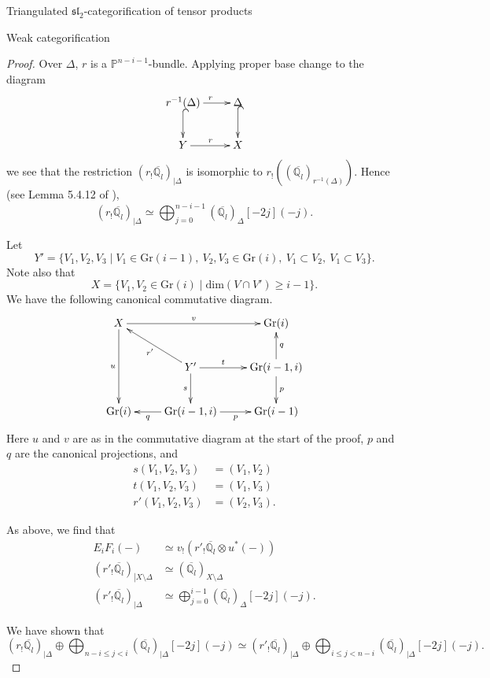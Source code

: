 \documentclass[12pt]{amsart}
\theoremstyle{definition}
\theoremstyle{remark}
\theoremstyle{remark}
\begin{document}
\begin{section}{Triangulated $\mathfrak{sl}_{2}$-categorification of tensor products}
\begin{subsection}{Weak categorification}
\begin{proof}
Over $\Delta$, $r$ is a $\mathbb{P}^{n-i-1}$-bundle. Applying proper base change to the diagram \[ \xymatrix{ r^{-1}(\Delta) \ar@{^{(}->}[d] \ar[r]^{r} & \Delta \ar@{^{(}->}[d] \\ Y \ar[r]^{r} & X } \] we see that the restriction $(r_{!} \overline{\mathbb{Q}_{l}})_{\left| \Delta \right.}$ is isomorphic to $r_{!} ((\overline{\mathbb{Q}_{l}})_{r^{-1}(\Delta)})$. Hence (see Lemma 5.4.12 of \cite{BeilinsonBernsteinDeligneFaisceauxPervers}),  \[ (r_{!} \overline{\mathbb{Q}_{l}})_{\left| \Delta \right.} \simeq  \bigoplus_{j=0}^{n-i-1} (\overline{\mathbb{Q}_{l}})_{\Delta}[-2j](-j). \] 

Let \[ Y' = \{ V_{1}, V_{2}, V_{3} \mid V_{1} \in \text{Gr}(i-1), \ V_{2}, V_{3} \in \text{Gr}(i), \  V_{1} \subset V_{2}, \ V_{1} \subset V_{3} \}. \] Note also that \[ X = \{ V_{1}, V_{2} \in \text{Gr}(i) \mid \text{dim} (V \cap V') \geq i-1 \}. \] We have the following canonical commutative diagram. \[ \xymatrix{ X \ar[rr]^-{v} \ar[dd]_-{u} &  & \text{Gr}(i) \\ & Y' \ar[ul]^-{r'} \ar[r]^-{t} \ar[d]_-{s} & \text{Gr}(i-1,i) \ar[u]_-{q} \ar[d]^-{p} \\ \text{Gr}(i) & \text{Gr}(i-1,i) \ar[l]^-{q} \ar[r]_-{p} & \text{Gr}(i-1) } \] Here $u$ and $v$ are as in the commutative diagram at the start of the proof, $p$ and $q$ are the canonical projections, and \begin{align*} s(V_{1},V_{2},V_{3}) &= (V_{1},V_{2}) \\ t(V_{1},V_{2},V_{3}) &= (V_{1},V_{3}) \\ r'(V_{1},V_{2},V_{3}) &= (V_{2},V_{3}). \end{align*} 

As above, we find that \begin{align*} E_{i}F_{i}(-) &\simeq  v_{!}(r'_{!} \overline{\mathbb{Q}_{l}} \otimes u^{*}(-)) \\ (r'_{!} \overline{\mathbb{Q}_{l}})_{\left| X \setminus \Delta \right.} &\simeq (\overline{\mathbb{Q}_{l}})_{X \setminus \Delta} \\ (r'_{!} \overline{\mathbb{Q}_{l}})_{\left| \Delta \right.} &\simeq \bigoplus_{j=0}^{i-1} (\overline{\mathbb{Q}_{l}})_{\Delta}[-2j](-j). \end{align*} 

We have shown that \[ (r_{!} \overline{\mathbb{Q}_{l}})_{\left| \Delta \right.}  \oplus \bigoplus_{n-i \leq j < i}  (\overline{\mathbb{Q}_{l}})_{\left| \Delta \right.}[-2j](-j) \simeq (r'_{!} \overline{\mathbb{Q}_{l}})_{\left| \Delta \right.} \oplus \bigoplus_{i \leq j < n-i}  (\overline{\mathbb{Q}_{l}})_{\left| \Delta \right.}[-2j](-j). \]


\end{proof}
\end{subsection}
\end{section}
\end{document}
